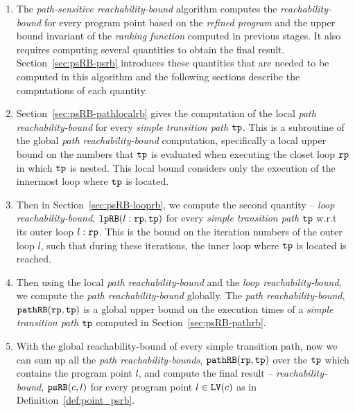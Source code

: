 \begin{enumerate}
\item The \emph{path-sensitive reachability-bound} algorithm computes the \emph{reachability-bound} for every program point based on the \emph{refined program} and the upper bound invariant of the \emph{ranking function} computed in previous stages.
It also requires computing several quantities to obtain the final result.
Section~\ref{sec:psRB-psrb} introduces these quantities that are needed to be computed in this algorithm and the following sections describe the computations of each quantity. 
 \item Section~\ref{sec:psRB-pathlocalrb} gives the computation of the local \emph{path reachability-bound}  for every \emph{simple transition path} $\mathtt{tp}$. 
 This is a subroutine of the global \emph{path reachability-bound} computation, specifically a local upper bound on the numbers that  $\mathtt{tp}$ is evaluated when executing the closet loop  $\mathtt{rp}$ in which $\mathtt{tp}$ is nested.
 This local bound considers only the execution of the innermost loop where $\mathtt{tp}$ is located.
 \item Then in Section~\ref{sec:psRB-looprb}, we compute the second quantity -- \emph{loop reachability-bound}, $\mathtt{lpRB}(l: \mathtt{rp}, \mathtt{tp})$ for every \emph{simple transition path} $\mathtt{tp}$
 w.r.t its outer loop $l: \mathtt{rp}$. 
 This is the bound on the iteration numbers of the outer loop $l$,
 such that during these iterations, the inner loop where $\mathtt{tp}$ is located is reached.
 \item Then using the local \emph{path reachability-bound} and the  \emph{loop reachability-bound},
 we compute the \emph{path reachability-bound} globally.
 The \emph{path reachability-bound}, $\mathtt{pathRB}(\mathtt{rp}, \mathtt{tp})$ is a global upper bound on the execution times of a \emph{simple transition path} $\mathtt{tp}$ computed in Section~\ref{sec:psRB-pathrb}.
 
 \item With the global reachability-bound of every simple transition path, now we can sum up all the \emph{path reachability-bounds}, $\mathtt{pathRB}(\mathtt{rp}, \mathtt{tp})$ over the $\mathtt{tp}$ which contains the program point $l$, and compute the final result -- \emph{reachability-bound}, $\mathtt{psRB}(c, l)$ for every program point $l \in \mathtt{LV}(c)$ as in Definition~\ref{def:point_psrb}.
\end{enumerate}